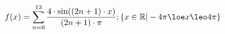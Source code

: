 \documentclass[preview]{standalone}
\begin{document}
\begin{align*}
f(x) = \sum_{n=0}^{13} \frac{4 \cdot \sin ((2n + 1) \cdot x) }{ (2n + 1) \cdot \pi}                 ; \{ x \in \mathbb{R} | -4 \pi \loe x \leo 4 \pi \}
\end{align*}
\end{document}

